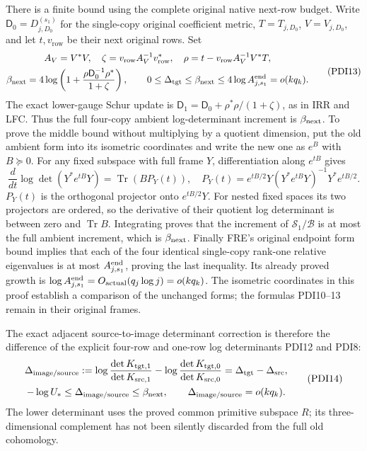 \documentclass[10pt]{article}
\begin{document}
There is a finite bound using the complete original native
next-row budget. Write $\mathsf D_0=D_{j,D_0}^{(s_1)}$ for
the single-copy original coefficient metric, $T=T_{j,D_0}$,
$V=V_{j,D_0}$, and let $t,v_\mathrm{row}$ be their next
original rows. Set
\[
 \begin{gathered}
 A_V=V^*V,\quad
 \zeta=v_\mathrm{row}A_V^{-1}v_\mathrm{row}^*,\quad
 \rho=t-v_\mathrm{row}A_V^{-1}V^*T,\\
 \beta_{\rm next}=4\log\left(1+
       \frac{\rho\mathsf D_0^{-1}\rho^*}{1+\zeta}\right),\qquad
 0\le\Delta_{\rm tgt}\le\beta_{\rm next}
       \le4\log A_{j,s_1}^{\rm end}=o(kq_k).
 \end{gathered}\tag{PDI13}
\]
The exact lower-gauge Schur update is
$\mathsf D_1=\mathsf D_0+\rho^*\rho/(1+\zeta)$, as in
IRR and LFC. Thus the full four-copy ambient log-determinant
increment is $\beta_{\rm next}$. To prove the middle bound
without multiplying by a quotient dimension, put the old
ambient form into its isometric coordinates and write the
new one as $e^{B}$ with $B\succeq0$. For any fixed subspace
with full frame $Y$, differentiation along $e^{tB}$ gives
\[
 \frac{d}{dt}\log\det(Y^*e^{tB}Y)
 =\operatorname{Tr}(BP_Y(t)),\quad
 P_Y(t)=e^{tB/2}Y(Y^*e^{tB}Y)^{-1}Y^*e^{tB/2} .
\]
$P_Y(t)$ is the orthogonal projector onto $e^{tB/2}Y$.
For nested fixed spaces its two projectors are ordered, so
the derivative of their quotient log determinant is between
zero and $\operatorname{Tr}B$. Integrating proves that the
increment of $\mathscr S_1/\mathscr B$ is at most the full
ambient increment, which is $\beta_{\rm next}$. Finally
FRE's original endpoint form bound implies that each of the
four identical single-copy rank-one relative eigenvalues is
at most $A_{j,s_1}^{\rm end}$, proving the last inequality.
Its already proved growth is $\log A_{j,s_1}^{\rm end}
=O_{\rm actual}(q_j\log j)=o(kq_k)$. The isometric coordinates
in this proof establish a comparison of the unchanged forms;
the formulas PDI10--13 remain in their original frames.

The exact adjacent source-to-image determinant correction is
therefore the difference of the explicit four-row and one-row
log determinants PDI12 and PDI8:
\[
 \begin{gathered}
 \Delta_{\rm image/source}:=
 \log\frac{\det K_{{\rm tgt},1}}{\det K_{{\rm src},1}}
 -\log\frac{\det K_{{\rm tgt},0}}{\det K_{{\rm src},0}}
       =\Delta_{\rm tgt}-\Delta_{\rm src},\\
 -\log U_*\le\Delta_{\rm image/source}\le\beta_{\rm next},
 \qquad\Delta_{\rm image/source}=o(kq_k).
 \end{gathered}\tag{PDI14}
\]
The lower determinant uses the proved common primitive
subspace $R$; its three-dimensional complement has not been
silently discarded from the full old cohomology.
\end{document}
